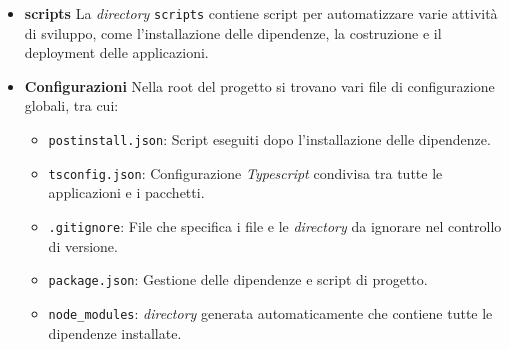 \begin{itemize}
    \item \textbf{scripts}
    La \textit{directory} \texttt{scripts} contiene script per automatizzare varie attività di sviluppo, come l'installazione delle dipendenze, la costruzione e il deployment delle applicazioni.

    \item \textbf{Configurazioni}
    Nella root del progetto si trovano vari file di configurazione globali, tra cui:
    \begin{itemize}
        \item \texttt{postinstall.json}: Script eseguiti dopo l'installazione delle dipendenze.
        \item \texttt{tsconfig.json}: Configurazione \textit{Typescript} condivisa tra tutte le applicazioni e i pacchetti.
        \item \texttt{.gitignore}: File che specifica i file e le \textit{directory} da ignorare nel controllo di versione.
        \item \texttt{package.json}: Gestione delle dipendenze e script di progetto.
        \item \texttt{node\_modules}: \textit{directory} generata automaticamente che contiene tutte le dipendenze installate.
    \end{itemize}
\end{itemize}

